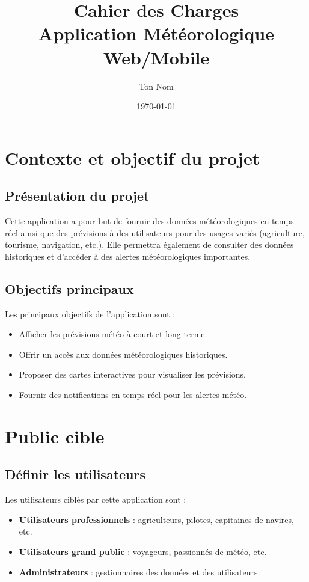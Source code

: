 \documentclass[a4paper,12pt]{article}
\title{Cahier des Charges\\Application Météorologique Web/Mobile}
\author{Ton Nom}
\date{\today}
\begin{document}
\maketitle

\tableofcontents
\newpage

\section{Contexte et objectif du projet}
\subsection{Présentation du projet}
Cette application a pour but de fournir des données météorologiques en temps réel ainsi que des prévisions à des utilisateurs pour des usages variés (agriculture, tourisme, navigation, etc.). 
Elle permettra également de consulter des données historiques et d'accéder à des alertes météorologiques importantes.

\subsection{Objectifs principaux}
Les principaux objectifs de l'application sont :
\begin{itemize}
    \item Afficher les prévisions météo à court et long terme.
    \item Offrir un accès aux données météorologiques historiques.
    \item Proposer des cartes interactives pour visualiser les prévisions.
    \item Fournir des notifications en temps réel pour les alertes météo.
\end{itemize}

\section{Public cible}
\subsection{Définir les utilisateurs}
Les utilisateurs ciblés par cette application sont :
\begin{itemize}
    \item \textbf{Utilisateurs professionnels} : agriculteurs, pilotes, capitaines de navires, etc.
    \item \textbf{Utilisateurs grand public} : voyageurs, passionnés de météo, etc.
    \item \textbf{Administrateurs} : gestionnaires des données et des utilisateurs.
\end{itemize}
\end{document}
